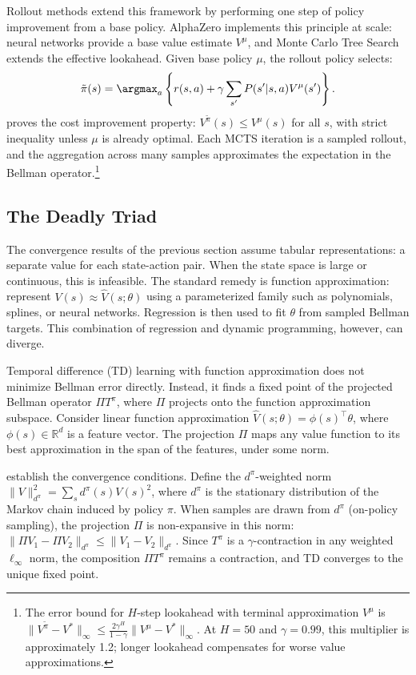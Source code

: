 Rollout methods extend this framework by performing one step of policy improvement from a base policy. AlphaZero \citep{Silver2018} implements this principle at scale: neural networks provide a base value estimate $V^\mu$, and Monte Carlo Tree Search extends the effective lookahead. Given base policy $\mu$, the rollout policy selects:
\begin{equation}
\tilde{\pi}(s) = \argmax_a \left\{ r(s,a) + \gamma \sum_{s'} P(s'|s,a) V^\mu(s') \right\}.
\end{equation}
\citet{bertsekas2021lessons} proves the cost improvement property: $V^{\tilde{\pi}}(s) \leq V^\mu(s)$ for all $s$, with strict inequality unless $\mu$ is already optimal. Each MCTS iteration is a sampled rollout, and the aggregation across many samples approximates the expectation in the Bellman operator.\footnote{The error bound for $H$-step lookahead with terminal approximation $V^\mu$ is $\|V^{\tilde{\pi}} - V^*\|_\infty \leq \frac{2\gamma^H}{1-\gamma} \|V^\mu - V^*\|_\infty$. At $H=50$ and $\gamma=0.99$, this multiplier is approximately 1.2; longer lookahead compensates for worse value approximations.}


\subsection{The Deadly Triad}
\label{sec:deadly_triad}

The convergence results of the previous section assume tabular representations: a separate value for each state-action pair. When the state space is large or continuous, this is infeasible. The standard remedy is function approximation: represent $V(s) \approx \hat{V}(s; \theta)$ using a parameterized family such as polynomials, splines, or neural networks. Regression is then used to fit $\theta$ from sampled Bellman targets. This combination of regression and dynamic programming, however, can diverge.

Temporal difference (TD) learning with function approximation does not minimize Bellman error directly. Instead, it finds a fixed point of the projected Bellman operator $\Pi T^\pi$, where $\Pi$ projects onto the function approximation subspace. Consider linear function approximation $\hat{V}(s; \theta) = \phi(s)^\top \theta$, where $\phi(s) \in \mathbb{R}^d$ is a feature vector. The projection $\Pi$ maps any value function to its best approximation in the span of the features, under some norm.

\citet{tsitsiklis1997} establish the convergence conditions. Define the $d^\pi$-weighted norm $\|V\|_{d^\pi}^2 = \sum_s d^\pi(s) V(s)^2$, where $d^\pi$ is the stationary distribution of the Markov chain induced by policy $\pi$. When samples are drawn from $d^\pi$ (on-policy sampling), the projection $\Pi$ is non-expansive in this norm: $\|\Pi V_1 - \Pi V_2\|_{d^\pi} \leq \|V_1 - V_2\|_{d^\pi}$. Since $T^\pi$ is a $\gamma$-contraction in any weighted $\ell_\infty$ norm, the composition $\Pi T^\pi$ remains a contraction, and TD converges to the unique fixed point.

